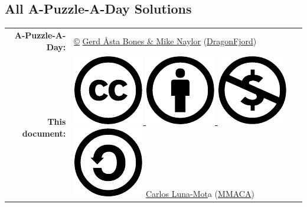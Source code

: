 \documentclass[a4paper, 10pt]{article}
\begin{document}
    \begin{center}
        
        \section*{\Huge All A-Puzzle-A-Day Solutions}
        \bigskip
        
        {\large \begin{tabular}{rl}
         \textbf{A-Puzzle-A-Day:} & \href{https://en.wikipedia.org/wiki/All_rights_reserved}{©} %
            \href{https://www.dragonfjord.com/about-us/}{Gerd Åsta Bones \& Mike Naylor} (\href{https://www.dragonfjord.com/}{DragonFjord}) \\[1ex]
        \textbf{This document:} & \href{https://creativecommons.org/licenses/by-nc-sa/4.0/}{%
            \includegraphics[scale=0.16]{cc.pdf}%
            \includegraphics[scale=0.16]{by.pdf}%
            \includegraphics[scale=0.16]{nc.pdf}%
            \includegraphics[scale=0.16]{sa.pdf}} %
            \href{https://github.com/CarlosLunaMota}{Carlos Luna-Mot}a (\href{https://mmaca.cat/}{MMACA})
        \end{tabular}}


\end{center}
\end{document}
